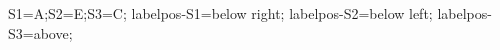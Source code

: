 \documentclass[exercice]{thedocument}%
\begin{document}
%
\>S1=A;\>S2=E;\>S3=C;%
\>labelpos-S1=below right;%
\>labelpos-S2=below left;%
\>labelpos-S3=above;%
%
\end{document}
